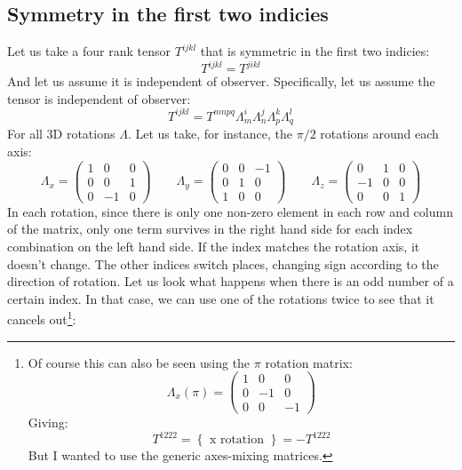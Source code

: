 \documentclass{article}
\begin{document}
\subsection{Symmetry in the first two indicies}
Let us take a four rank tensor $T^{ijkl}$ that is symmetric in the first two indicies:
\begin{equation}
    T^{ijkl} = T^{jikl}
\end{equation}
And let us assume it is independent of observer. Specifically, let us assume the tensor is independent of observer:
\begin{equation}
    T^{ijkl} = T^{mnpq}\Lambda^i_m\Lambda^j_n\Lambda^k_p\Lambda^l_q
\end{equation}
For all 3D rotations $\Lambda$. Let us take, for instance, the $\pi/2$ rotations around each axis:
\begin{equation}
    \Lambda_x = \begin{pmatrix}
        1 & 0 & 0 \\ 0 & 0 & 1 \\ 0 & -1 & 0
    \end{pmatrix}
    \qquad
    \Lambda_y = \begin{pmatrix}
        0 & 0 & -1 \\ 0 & 1 & 0 \\ 1 & 0 & 0
    \end{pmatrix}
    \qquad
    \Lambda_z = \begin{pmatrix}
        0 & 1 & 0 \\ -1 & 0 & 0 \\ 0 & 0 & 1
    \end{pmatrix}
\end{equation}
In each rotation, since there is only one non-zero element in each row and column of the matrix, only one term survives in the right hand side for each index combination on the left hand side. If the index matches the rotation axis, it doesn't change. The other indices switch places, changing sign according to the direction of rotation.
\newline
Let us look what happens when there is an odd number of a certain index. In that case, we can use one of the rotations twice to see that it cancels out\footnote{
    Of course this can also be seen using the $\pi$ rotation matrix:
    \begin{equation}
        \Lambda_x(\pi) = \begin{pmatrix}
            1 & 0 & 0 \\ 0 & -1 & 0  \\ 0 & 0 & -1
        \end{pmatrix}
    \end{equation}
Giving:
\begin{equation}
    T^{1222} = \left\{\text{ x rotation }\right\} = -T^{1222}
\end{equation}
But I wanted to use the generic axes-mixing matrices.
}:
\end{document}
